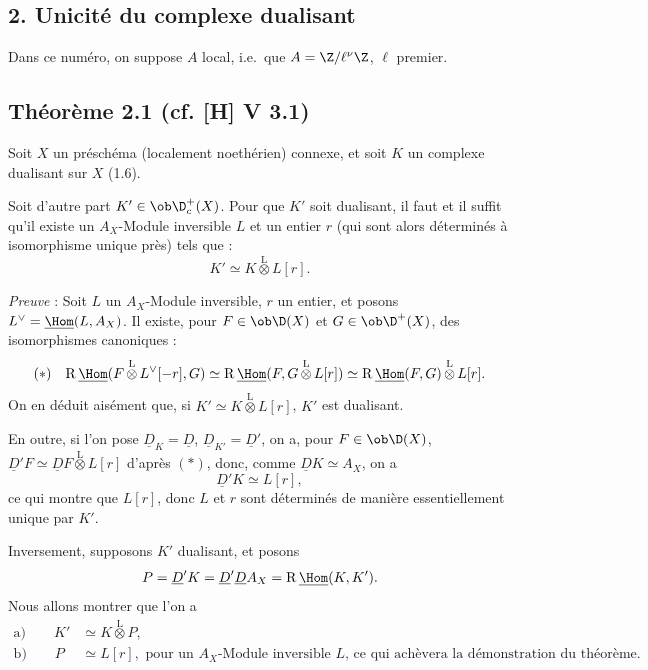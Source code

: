 \subsection*{2. Unicité du complexe dualisant}

Dans ce numéro, on suppose $A$ local, i.e.~que $A = \Z/\ell^{\nu}\Z$, $\ell$ premier.

\subsection*{Théorème 2.1 (cf. [H] V 3.1)}
Soit $X$ un préschéma (localement noethérien) connexe, et soit $K$ un complexe dualisant sur $X$ (1.6).

Soit d'autre part $K' \in \ob \D_c^{+}(X)$. Pour que $K'$ soit dualisant, il faut et il suffit qu'il existe un $A_X$-Module inversible $L$ et un entier $r$ (qui sont 
alors
déterminés à isomorphisme unique près) tels que :
\[
K' \simeq K \mathop{\otimes}\limits^{\mathrm{L}} L[r].
\]

\emph{Preuve} : Soit $L$ un $A_X$-Module inversible, $r$ un entier, et posons $L^{\vee} = \underline{\Hom}(L, A_X)$. Il existe, pour $F \in \ob \D(X)$ et $G \in \ob \D^{+}(X)$, des isomorphismes canoniques :
\[
(*) \quad \mathrm{R}\,\underline{\Hom}(F \mathop{\otimes}\limits^{\mathrm{L}} L^{\vee}[-r], G) \simeq \mathrm{R}\,\underline{\Hom}(F, G \mathop{\otimes}\limits^{\mathrm{L}} L[r]) \simeq \mathrm{R}\,\underline{\Hom}(F,G) \mathop{\otimes}\limits^{\mathrm{L}} L[r].
\]
On en déduit aisément que, si $K' \simeq K \mathop{\otimes}\limits^{\mathrm{L}} L[r]$, $K'$ est dualisant.

En outre, si l'on pose $\underline{D}_K = \underline{D}$, $\underline{D}_{K'} = \underline{D}'$, on a, pour $F \in \ob \D(X)$, $\underline{D}'F \simeq \underline{D} F \mathop{\otimes}\limits^{\mathrm{L}} L[r]$ d'après $(*)$, donc, comme $\underline{D} K \simeq A_X$, on a
\[
\underline{D}' K \simeq L[r],
\]
ce qui montre que $L[r]$, donc $L$ et $r$ sont déterminés de manière essentiellement unique par $K'$.

Inversement, supposons $K'$ dualisant, et posons
\[
P = \underline{D}'K = \underline{D}'\underline{D} A_X = \mathrm{R}\,\underline{\Hom}(K,K').
\]
Nous allons montrer que l'on a
\begin{align*}
\text{a)} \qquad K' &\simeq K \mathop{\otimes}\limits^{\mathrm{L}} P, \\
\text{b)} \qquad P &\simeq L[r], \text{ pour un $A_X$-Module inversible $L$, ce qui achèvera la démonstration du théorème.}
\end{align*}

